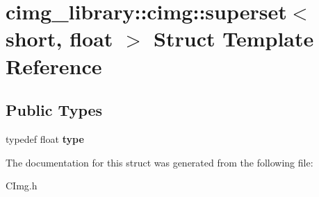 \hypertarget{structcimg__library_1_1cimg_1_1superset_3_01short_00_01float_01_4}{\section{cimg\-\_\-library\-:\-:cimg\-:\-:superset$<$ short, float $>$ Struct Template Reference}
\label{structcimg__library_1_1cimg_1_1superset_3_01short_00_01float_01_4}
}
\subsection*{Public Types}
\begin{DoxyCompactItemize}
\item 
\hypertarget{structcimg__library_1_1cimg_1_1superset_3_01short_00_01float_01_4_a841c93323bfa72d3dac5daafaa04c9de}{typedef float {\bfseries type}}\label{structcimg__library_1_1cimg_1_1superset_3_01short_00_01float_01_4_a841c93323bfa72d3dac5daafaa04c9de}

\end{DoxyCompactItemize}


The documentation for this struct was generated from the following file\-:\begin{DoxyCompactItemize}
\item 
C\-Img.\-h\end{DoxyCompactItemize}
